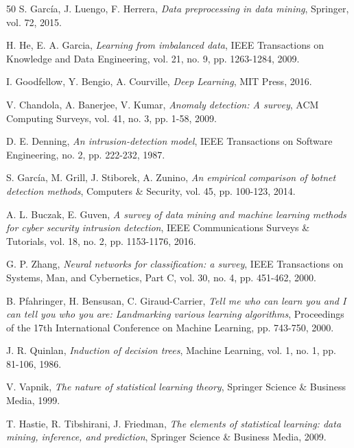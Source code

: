 \begin{thebibliography}{50}
S. García, J. Luengo, F. Herrera, 
\textit{Data preprocessing in data mining}, 
Springer, vol. 72, 2015.

H. He, E. A. Garcia, 
\textit{Learning from imbalanced data}, 
IEEE Transactions on Knowledge and Data Engineering, vol. 21, no. 9, pp. 1263-1284, 2009.

I. Goodfellow, Y. Bengio, A. Courville, 
\textit{Deep Learning}, 
MIT Press, 2016.

V. Chandola, A. Banerjee, V. Kumar, 
\textit{Anomaly detection: A survey}, 
ACM Computing Surveys, vol. 41, no. 3, pp. 1-58, 2009.

D. E. Denning, 
\textit{An intrusion-detection model}, 
IEEE Transactions on Software Engineering, no. 2, pp. 222-232, 1987.

S. García, M. Grill, J. Stiborek, A. Zunino, 
\textit{An empirical comparison of botnet detection methods}, 
Computers \& Security, vol. 45, pp. 100-123, 2014.

A. L. Buczak, E. Guven, 
\textit{A survey of data mining and machine learning methods for cyber security intrusion detection}, 
IEEE Communications Surveys \& Tutorials, vol. 18, no. 2, pp. 1153-1176, 2016.

G. P. Zhang, 
\textit{Neural networks for classification: a survey}, 
IEEE Transactions on Systems, Man, and Cybernetics, Part C, vol. 30, no. 4, pp. 451-462, 2000.

B. Pfahringer, H. Bensusan, C. Giraud-Carrier, 
\textit{Tell me who can learn you and I can tell you who you are: Landmarking various learning algorithms}, 
Proceedings of the 17th International Conference on Machine Learning, pp. 743-750, 2000.

J. R. Quinlan, 
\textit{Induction of decision trees}, 
Machine Learning, vol. 1, no. 1, pp. 81-106, 1986.

V. Vapnik, 
\textit{The nature of statistical learning theory}, 
Springer Science \& Business Media, 1999.

T. Hastie, R. Tibshirani, J. Friedman, 
\textit{The elements of statistical learning: data mining, inference, and prediction}, 
Springer Science \& Business Media, 2009.


\end{thebibliography}
